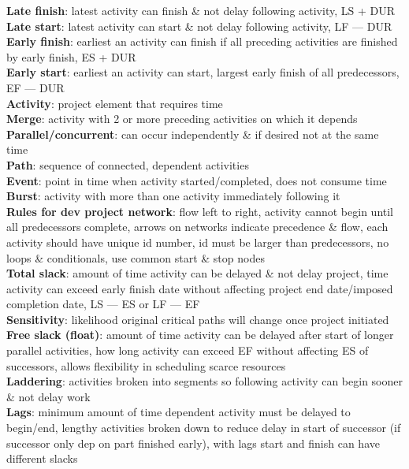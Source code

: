 \documentclass[a4paper]{article}
\begin{document}
\begin{multicols}{3}
        \textbf{Late finish}: latest activity can finish \& not delay following activity, LS + DUR\\
        \textbf{Late start}: latest activity can start \& not delay following activity, LF --- DUR\\
        \textbf{Early finish}: earliest an activity can finish if all preceding activities are finished by early finish, ES + DUR\\
        \textbf{Early start}: earliest an activity can start, largest early finish of all predecessors, EF ---  DUR\\
        \textbf{Activity}: project element that requires time\\
        \textbf{Merge}: activity with 2 or more preceding activities on which it depends\\
        \textbf{Parallel/concurrent}: can occur independently \& if desired not at the same time\\
        \textbf{Path}: sequence of connected, dependent activities\\
        \textbf{Event}: point in time when activity started/completed, does not consume time\\
        \textbf{Burst}: activity with more than one activity immediately following it\\
        \textbf{Rules for dev project network}: flow left to right, activity cannot begin until all predecessors complete, arrows on networks indicate precedence \& flow, each activity should have unique id number, id must be larger than predecessors, no loops \& conditionals, use common start \& stop nodes\\
        \textbf{Total slack}: amount of time activity can be delayed \& not delay project, time activity can exceed early finish date without affecting project end date/imposed completion date, LS --- ES or LF --- EF\\
        \textbf{Sensitivity}: likelihood original critical paths will change once project initiated\\
        \textbf{Free slack (float)}: amount of time activity can be delayed after start of longer parallel activities, how long activity can exceed EF without affecting ES of successors, allows flexibility in scheduling scarce resources\\
        \textbf{Laddering}: activities broken into segments so following activity can begin sooner \& not delay work\\
        \textbf{Lags}: minimum amount of time dependent activity must be delayed to begin/end, lengthy activities broken down to reduce delay in start of successor (if successor only dep on part finished early), with lags start and finish can have different slacks\\

\end{multicols}
\end{document}
